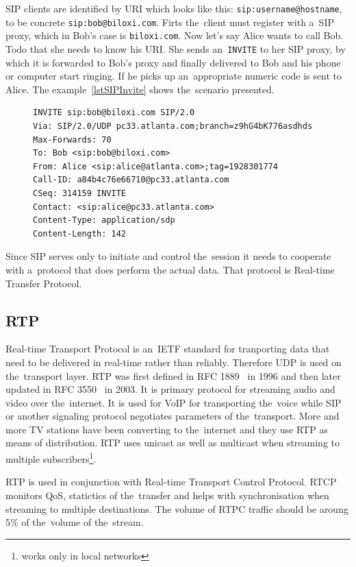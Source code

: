 SIP clients are identified by URI which looks like this: \verb|sip:username@hostname|, to be concrete \verb|sip:bob@biloxi.com|. Firts the~client must register with a~SIP proxy, which in Bob's case is \verb|biloxi.com|. Now let's say Alice wants to call Bob. Todo that she needs to know his URI. She sends an~\verb|INVITE| to her SIP proxy, by which it is forwarded to Bob's proxy and finally delivered to Bob and his phone or computer start ringing. If he picks up an~appropriate numeric code is sent to Alice. The example~\ref{lstSIPInvite} shows the~scenario presented.    

\begin{figure}[h]
\begin{lstlisting}
INVITE sip:bob@biloxi.com SIP/2.0
Via: SIP/2.0/UDP pc33.atlanta.com;branch=z9hG4bK776asdhds
Max-Forwards: 70
To: Bob <sip:bob@biloxi.com>
From: Alice <sip:alice@atlanta.com>;tag=1928301774
Call-ID: a84b4c76e66710@pc33.atlanta.com
CSeq: 314159 INVITE
Contact: <sip:alice@pc33.atlanta.com>
Content-Type: application/sdp
Content-Length: 142
\end{lstlisting}
\end{figure}

Since SIP serves only to initiate and control the~session it needs to cooperate with a~protocol that does perform the actual data. That protocol is Real-time Transfer Protocol.  

\subsection*{RTP}
Real-time Transport Protocol is an~IETF standard for tranporting data that need to be delivered in real-time rather than reliably. Therefore UDP is used on the~transport layer. RTP was first defined in RFC 1889~\cite{rtpOldRFC} in 1996 and then later updated in RFC 3550~\cite{rtpRFC} in 2003. It is primary protocol for streaming audio and video over the~internet. It is used for VoIP for transporting the~voice while SIP or another signaling protocol negotiates parameters of the~transport. More and more TV stations have been converting to the~internet and they use RTP as means of distribution. RTP uses unicast as well as multicast when streaming to multiple subscribers\footnote{works only in local networks}. 

RTP is used in conjunction with Real-time Transport Control Protocol. RTCP monitors QoS, statictics of the~transfer and helps with synchronisation when streaming to multiple destinations. The volume of RTPC traffic should be aroung 5\% of the~volume of the~stream.  

